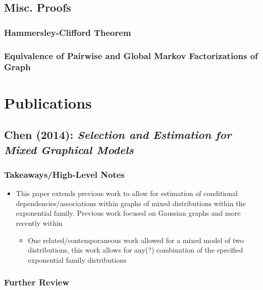 \documentclass[11pt]{article}
\begin{document}
\newpage 
\section*{Misc. Proofs}

\subsection*{Hammersley-Clifford Theorem}

\subsection*{Equivalence of Pairwise and Global Markov Factorizations of Graph}


\newpage 

\begin{tcolorbox}
\vspace{4mm}
\bf \LARGE \chapter{Publications}
\vspace{4mm}
\end{tcolorbox}

\section*{Chen (2014): {\large \it Selection and Estimation for Mixed Graphical Models}}

\subsection*{Takeaways/High-Level Notes}
	\begin{itemize}
		\item This paper extends previous work to allow for estimation of conditional dependencies/associations within graphs of mixed distributions within the exponential family. Previous work focused on Gaussian graphs and more recently within 
		\begin{itemize}
			\item One related/contemporaneous work allowed for a mixed model of two distributions, this work allows for any(?) combination of the specified exponential family distributions
        \end{itemize}
	\end{itemize}

\subsection*{Further Review}
	
\end{document}
